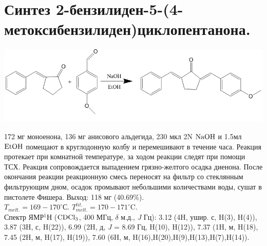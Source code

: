 \documentclass[a4paper]{article}
\begin{document}
\section{Синтез 2-бензилиден-5-(4-метоксибензилиден)циклопентанона.}
\begin{center}
\includegraphics[scale=0.35]{pictures/2.png}
\end{center}
172 мг  моноенона, 136 мг анисового альдегида, 230 мкл 2N $\ce{NaOH}$ и 1.5мл $\ce{EtOH}$ помещают в круглодонную колбу и перемешивают в течение часа. Реакция протекает при комнатной температуре, за ходом реакции следят при помощи ТСХ. Реакция сопровождается выпадением грязно-желтого осадка диенона. После окончания реакции реакционную смесь переносят на фильтр со стеклянным фильтрующим дном, осадок промывают небольшими количествами воды, сушат в пистолете Фишера. Выход: 118 мг (40.69$\%$). \\
$T_{melt.} = 169-170^{\circ}$С. $T_{melt.}^{lit.} = 170-171^{\circ}$C. \cite{rosamilia2006} \\
Спектр ЯМР$^{1}$Н ($\ce{CDCl3}$, 400 МГц, $\delta$ м.д., \textit{J} Гц): 3.12 (4H, ушир. с, H(3), H(4)), 3.87 (3H, с, H(22)), 6.99 (2H, д, \textit{J} = 8.69 Гц, H(10), H(12)), 7.37 (1H, м, H(18), 7.45 (2H, м, H(17), H(19)), 7.60 (6H, м, H(16),H(20),H(9),H(13),H(7),H(14)).
\end{document}
